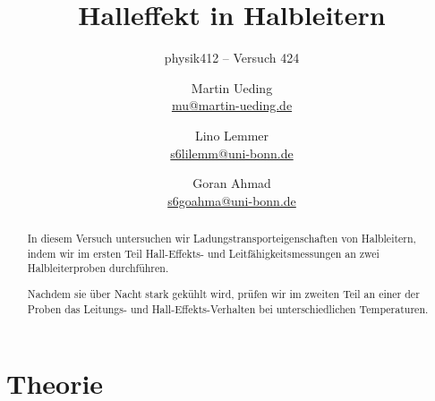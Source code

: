 


\usepackage[section]{placeins}
\usepackage{booktabs}
\usepackage{pdflscape}

\newcommand\versuchsnummer{424}
\DeclareMathOperator\std{std}

\newcommand\erklaerungFehlerNotation{%
In dieser Notation bedeutet \num{1.234 +- 0.005}, dass der Wert
$\num{1.234} \pm \num{0.005}$ ist. Die Ziffern in Klammern sind die
Fehlerangabe. Um den Fehler zu erhalten, wird diese von rechts über die
Zahl gelegt, alle anderen Stellen werden auf 0 gesetzt.
}

\ihead{physik412 – Versuch \versuchsnummer}

\subject{Praktikumsprotokoll}
\title{Halleffekt in Halbleitern}
\subtitle{physik412 – Versuch \versuchsnummer}
\author{
Martin Ueding \\
\small{\href{mailto:mu@martin-ueding.de}{mu@martin-ueding.de}}
\and
Lino Lemmer \\
\small{\href{mailto:s6lilemm@uni-bonn.de}{s6lilemm@uni-bonn.de}}
\and
Goran Ahmad \\
\small{\href{mailto:s6goahma@uni-bonn.de}{s6goahma@uni-bonn.de}}
}
\publishers{Tutor: Christian Hammann}

\setcounter{secnumdepth}{4}
\setcounter{tocdepth}{3}



\maketitle

\begin{abstract}
In diesem Versuch untersuchen wir Ladungstransporteigenschaften von
Halbleitern, indem wir im ersten Teil Hall-Effekts- und
Leitfähigkeitsmessungen an zwei Halbleiterproben durchführen.

Nachdem sie über Nacht stark gekühlt wird, prüfen wir im zweiten Teil an einer
der Proben das Leitungs- und Hall-Effekts-Verhalten bei unterschiedlichen
Temperaturen.
\end{abstract}

\tableofcontents

\newcommand\probeA{InAs~HF-540}
\newcommand\probeB{InAs~HF-301-040}

\chapter{Theorie}

